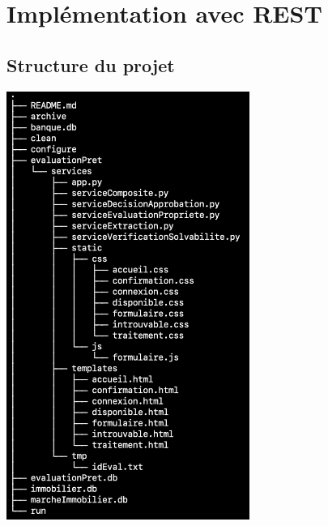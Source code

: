 \documentclass{article}
\begin{document}
    
\section{Implémentation avec REST}
	\subsection{Structure du projet}
    \includegraphics[width=225pt]{Images/11.1/tree.png}\\
    
\end{document}
